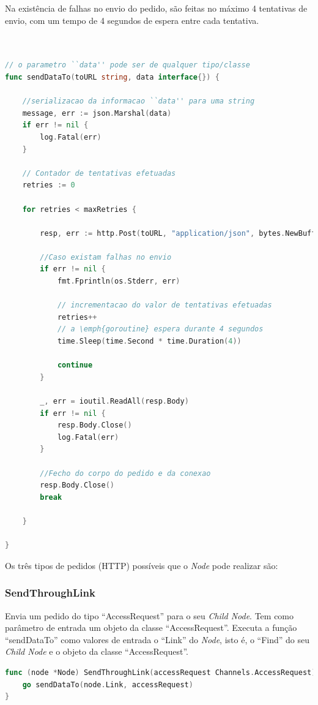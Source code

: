Na existência de falhas no envio do pedido, são feitas no máximo 4 tentativas de envio, com um tempo de 4 segundos de espera entre cada tentativa.
\begin{lstlisting}[caption={Método ``sendDataTo'' para envio de dados para outros \emph{Nodes}},language=Go]


// o parametro ``data'' pode ser de qualquer tipo/classe
func sendDataTo(toURL string, data interface{}) {

	//serializacao da informacao ``data'' para uma string
	message, err := json.Marshal(data)
	if err != nil {
		log.Fatal(err)
	}

	// Contador de tentativas efetuadas
	retries := 0

	for retries < maxRetries {

		resp, err := http.Post(toURL, "application/json", bytes.NewBuffer(message))

		//Caso existam falhas no envio
		if err != nil {
			fmt.Fprintln(os.Stderr, err)

			// incrementacao do valor de tentativas efetuadas
			retries++
			// a \emph{goroutine} espera durante 4 segundos
			time.Sleep(time.Second * time.Duration(4))

			continue
		}

		_, err = ioutil.ReadAll(resp.Body)
		if err != nil {
			resp.Body.Close()
			log.Fatal(err)
		}

		//Fecho do corpo do pedido e da conexao
		resp.Body.Close()
		break

	}

}

\end{lstlisting}


Os três tipos de pedidos (\acs{HTTP}) possíveis que o \emph{Node} pode realizar são:

\subsubsection*{SendThroughLink}
Envia um pedido do tipo ``AccessRequest'' para o seu \emph{Child Node}.
Tem como parâmetro de entrada um objeto da classe ``AccessRequest''.
Executa a função ``sendDataTo'' como valores de entrada o ``Link'' do \emph{Node}, isto é, o ``Find'' do seu \emph{Child Node}
e o objeto da classe ``AccessRequest''.

\begin{lstlisting}[caption={Método ``SendThroughLink''},language=Go]
func (node *Node) SendThroughLink(accessRequest Channels.AccessRequest) {
	go sendDataTo(node.Link, accessRequest)
}
\end{lstlisting}


